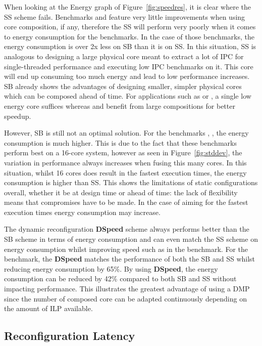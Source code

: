 When looking at the Energy graph of Figure~\ref{fig:speedres}, it is clear where the SS scheme fails.
Benchmarks  and  feature very little improvements when using core composition, if any, therefore the SS will perform very poorly when it comes to energy consumption for the benchmarks.
In the case of those benchmarks, the energy consumption is over 2x less on SB than it is on SS.
In this situation, SS is analogous to designing a large physical core meant to extract a lot of IPC for single-threaded performance and executing low IPC benchmarks on it.
This core will end up consuming too much energy and lead to low performance increases.
SB already shows the advantages of designing smaller, simpler physical cores which can be composed ahead of time.
For applications such as  or , a single low energy core suffices whereas  and  benefit from large compositions for better speedup.

However, SB is still not an optimal solution. 
For the benchmarks , ,  the energy consumption is much higher.
This is due to the fact that these benchmarks perform best on a 16-core system, however as seen in Figure~\ref{fig:stddev}, the variation in performance always increases when fusing this many cores.
In this situation, whilst 16 cores does result in the fastest execution times, the energy consumption is higher than SS.
This shows the limitations of static configurations overall, whether it be at design time or ahead of time: the lack of flexibility means that compromises have to be made.
In the case of aiming for the fastest execution times energy consumption may increase.

The dynamic reconfiguration \textbf{DSpeed} scheme always performs better than the SB scheme in terms of energy consumption and can even match the SS scheme on energy consumption whilst improving speed such as in the  benchmark.
For the  benchmark, the \textbf{DSpeed} matches the performance of both the SB and SS whilst reducing energy consumption by 65\%.
By using \textbf{DSpeed}, the energy consumption can be reduced by 42\% compared to both SB and SS without impacting performance.
This illustrates the greatest advantage of using a DMP since the number of composed core can be adapted continuously depending on the amount of ILP available.

\subsection{Reconfiguration Latency} \label{sec:reconfoverhead}

